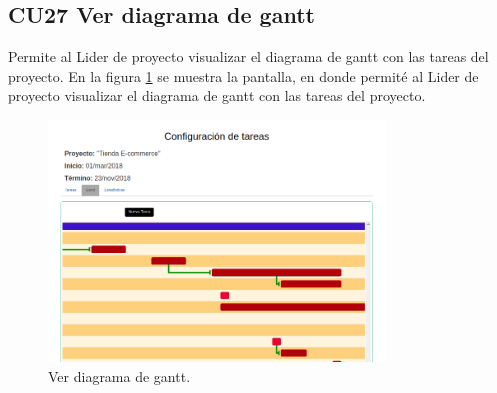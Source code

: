 \subsection{CU27 Ver diagrama de gantt}
{
\justify
{}
}

\justify
Permite al Lider de proyecto visualizar el diagrama de gantt con las tareas del proyecto.
{
\justify
{}
}
\justify
En la figura \ref{fig:IU27} se muestra la pantalla, en donde permité al Lider de proyecto visualizar el diagrama de gantt con las tareas del proyecto.

\begin{figure}[htb]
\centering
\includegraphics[width=0.8\textwidth]{./images/cu27-ver-diagrama-gantt.png}
\caption{Ver diagrama de gantt.} \label{fig:IU27}
\end{figure}